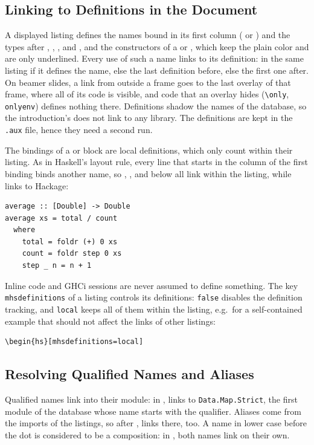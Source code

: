 \documentclass[10pt,DIV=12]{scrartcl}
\makeatletter
\let\T\texttt
\newcommand\key[1]{\T{#1}\index{#1@\texttt{#1} \idxkind{key}\string|hyperpage}}
\newcommand\code{\lstinline[language=lLatex,language addons=latex,basicstyle=\ttfamily,columns=flexible,keepspaces]}
\makeatother
\begin{document}
\subsection{Linking to Definitions in the Document}\label{sec:definitions}
A displayed listing defines the names bound in its first column ( or
) and the types after , , , and , and the
constructors of a  or , which keep the plain color and are only underlined.
Every use of such a name links to its definition: in the same listing if it defines the name,
else the last definition before, else the first one after. On beamer slides, a link from outside a frame
goes to the last overlay of that frame, where all of its code is visible, and code that an overlay
hides (\code|\only|, \T{onlyenv}) defines nothing there. Definitions shadow the names of the
database, so the introduction's  does not link to any library. The definitions are kept in
the \T{.aux} file, hence they need a second run.

The bindings of a  or  block are local definitions, which only count within their
listing. As in Haskell's layout rule, every line that starts in the column of the first binding binds
another name, so , , and  below all link within the listing, while
 links to Hackage:
\begin{verbatim}
average :: [Double] -> Double
average xs = total / count
  where
    total = foldr (+) 0 xs
    count = foldr step 0 xs
    step _ n = n + 1
\end{verbatim}
Inline code and GHCi sessions are never assumed to define something. The key \key{mhsdefinitions} of a
listing controls its definitions: \T{false} disables the definition tracking, and \T{local} keeps all
of them within the listing, e.g.\ for a self-contained example that should not affect the links of
other listings:
\begin{verbatim}
\begin{hs}[mhsdefinitions=local]
\end{verbatim}

\subsection{Resolving Qualified Names and Aliases}\label{sec:qualified}
Qualified names link into their module: in ,  links
to \T{Data.Map.Strict}, the first module of the database whose name starts with the qualifier.
Aliases come from the imports of the listings, so after
,  links there, too. A name in lower
case before the dot is considered to be a composition: in , both names link on their own.
\end{document}
